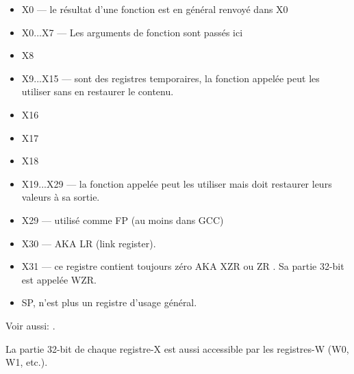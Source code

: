 \begin{itemize}
	\item X0 --- le résultat d'une fonction est en général renvoyé dans X0
	\item X0...X7 --- Les arguments de fonction sont passés ici
	\item X8
	\item X9...X15 --- sont des registres temporaires, la fonction appelée peut les utiliser sans en
	restaurer le contenu.
	\item X16
	\item X17
	\item X18
	\item X19...X29 --- la fonction appelée peut les utiliser mais doit restaurer leurs valeurs à sa
	sortie.
	\item X29 --- utilisé comme \ac{FP} (au moins dans GCC)
	\item X30 ---  \ac{AKA} \ac{LR} (\gls{link register}).
	\item X31 --- ce registre contient toujours zéro \ac{AKA} XZR ou ZR .
	Sa partie 32-bit est appelée WZR.
	\item \ac{SP}, n'est plus un registre d'usage général.
\end{itemize}

Voir aussi: \ARMPCS.

La partie 32-bit de chaque registre-X est aussi accessible par les registres-W (W0, W1, etc.).


